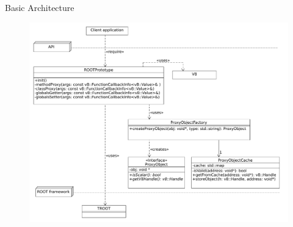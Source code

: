 \begin{frame}{Basic Architecture}
  \begin{figure}[htb]
    \centering
      \includegraphics[width=\textwidth, height=.85\textheight, keepaspectratio]{./resources/architecture/architecture_h6.pdf}
  \end{figure}
\end{frame}
